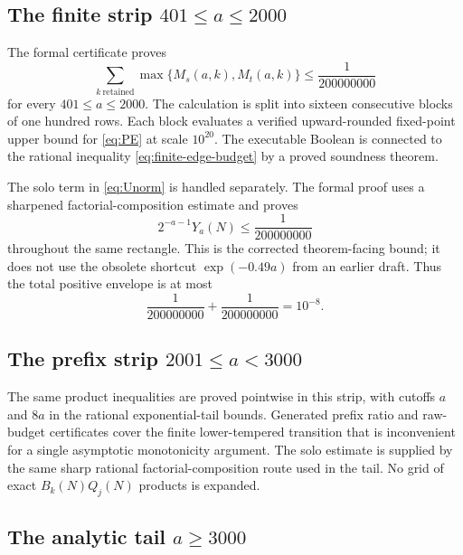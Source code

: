 \documentclass[11pt]{article}
\theoremstyle{definition}
\theoremstyle{remark}
\begin{document}
\subsection{The finite strip \texorpdfstring{$401\le a\le2000$}{401<=a<=2000}}

The formal certificate proves
\begin{equation}\label{eq:finite-edge-budget}
  \sum_{k\ \mathrm{retained}}\max\{M_s(a,k),M_t(a,k)\}
  \le\frac1{200000000}
\end{equation}
for every $401\le a\le2000$.  The calculation is split into sixteen
consecutive blocks of one hundred rows.  Each block evaluates a verified
upward-rounded fixed-point upper bound for \eqref{eq:PE} at scale $10^{20}$.
The executable Boolean is connected to the rational inequality
\eqref{eq:finite-edge-budget} by a proved soundness theorem.

The solo term in \eqref{eq:Unorm} is handled separately.  The formal proof
uses a sharpened factorial-composition estimate and proves
\begin{equation}\label{eq:solo-budget}
  2^{-a-1}Y_a(N)\le\frac1{200000000}
\end{equation}
throughout the same rectangle.  This is the corrected theorem-facing bound;
it does not use the obsolete shortcut $\exp(-0.49a)$ from an earlier draft.
Thus the total positive envelope is at most
\begin{equation}\label{eq:positive-target}
  \frac1{200000000}+\frac1{200000000}=10^{-8}.
\end{equation}

\subsection{The prefix strip \texorpdfstring{$2001\le a<3000$}{2001<=a<3000}}

The same product inequalities are proved pointwise in this strip, with
cutoffs $a$ and $8a$ in the rational exponential-tail bounds.  Generated
prefix ratio and raw-budget certificates cover the finite lower-tempered
transition that is inconvenient for a single asymptotic monotonicity
argument.  The solo estimate is supplied by the same sharp rational
factorial-composition route used in the tail.  No grid of exact
$B_k(N)Q_j(N)$ products is expanded.

\subsection{The analytic tail \texorpdfstring{$a\ge3000$}{a>=3000}}
\end{document}

